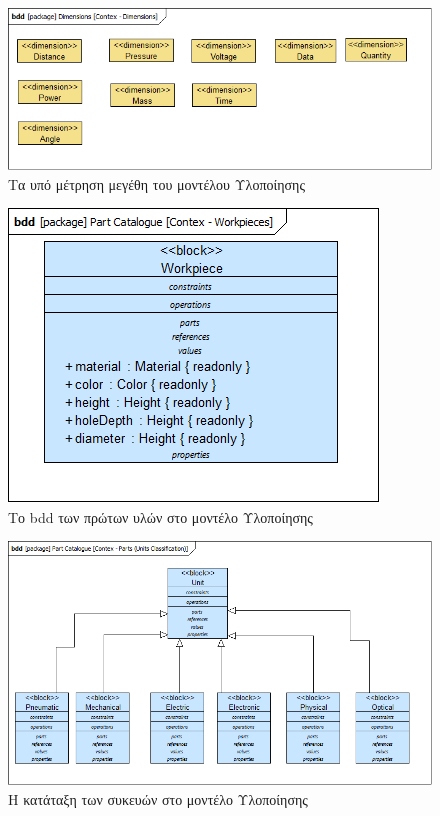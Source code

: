 \documentclass[a4paper,12pt,twoside]{report}
\begin{document}
{\begin{appendices}
				\begin{figure}[hp]
					\centering
					\includegraphics[scale=0.50]{DesignModel_Contex-Dimensions.png}
					\caption{Τα υπό μέτρηση μεγέθη του μοντέλου Υλοποίησης}
					\label{φωτ:Τα υπό μέτρηση μεγέθη του μοντέλου Υλοποίησης}
				\end{figure}
				
				\begin{figure}[hp]
					\centering
					\includegraphics[scale=0.50]{DesignModel_Contex-Workpieces.png}
					\caption{Το bdd των πρώτων υλών στο μοντέλο Υλοποίησης}
					\label{φωτ:Το bdd των πρώτων υλών στο μοντέλο Υλοποίησης}
				\end{figure}
				
				\begin{figure}[hp]
					\centering
					\includegraphics[scale=0.50]{DesignModel_Contex-Parts(UnitsClassification).png}
					\caption{Η κατάταξη των συκευών στο μοντέλο Υλοποίησης}
					\label{φωτ:Η κατάταξη των συκευών στο μοντέλο Υλοποίησης}
				\end{figure}
				

\end{appendices}}
\end{document}
